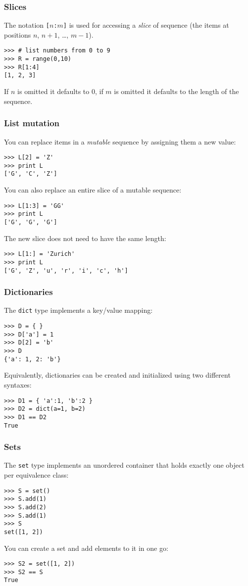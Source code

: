 \documentclass[english,serif,mathserif,xcolor=pdftex,dvipsnames,table]{beamer}
\begin{document}
\begin{frame}[fragile]
  \frametitle{Slices}
  The notation \texttt{[$n$:$m$]} is used for accessing a \emph{slice}
  of sequence (the items at positions $n$, $n+1$, \ldots, $m-1$).
\begin{lstlisting}
>>> # list numbers from 0 to 9
>>> R = range(0,10)
>>> R[1:4]
[1, 2, 3]
\end{lstlisting}

  \+
  If $n$ is omitted it defaults to 0, if $m$ is omitted it defaults to
  the length of the sequence.
\end{frame}


\begin{frame}[fragile]
  \frametitle{List mutation}
  You can replace items in a \emph{mutable} sequence by assigning them
  a new value:
\begin{lstlisting}
>>> L[2] = 'Z'
>>> print L
['G', 'C', 'Z']
\end{lstlisting}

  You can also replace an entire slice of a mutable sequence:
\begin{lstlisting}
>>> L[1:3] = 'GG'
>>> print L
['G', 'G', 'G']
\end{lstlisting}
  The new slice does not need to have the same length:
\begin{lstlisting}
>>> L[1:] = 'Zurich'
>>> print L
['G', 'Z', 'u', 'r', 'i', 'c', 'h']
\end{lstlisting}
\end{frame}


\begin{frame}[fragile]
  \frametitle{Dictionaries}
  The \texttt{dict} type implements a key/value mapping:
\begin{lstlisting}
>>> D = { }
>>> D['a'] = 1
>>> D[2] = 'b'
>>> D
{'a': 1, 2: 'b'}
\end{lstlisting}

  \+ 
  Equivalently, dictionaries can be created and initialized using two
  different syntaxes:
\begin{lstlisting}
>>> D1 = { 'a':1, 'b':2 }
>>> D2 = dict(a=1, b=2)
>>> D1 == D2
True
\end{lstlisting}
\end{frame}


\begin{frame}[fragile]
  \frametitle{Sets}
  The \texttt{set} type implements an unordered container that holds
  exactly one object per equivalence class:
\begin{lstlisting}
>>> S = set()
>>> S.add(1)
>>> S.add(2)
>>> S.add(1)
>>> S
set([1, 2])
\end{lstlisting}

  \+
  You can create a set and add elements to it in one go:
\begin{lstlisting}
>>> S2 = set([1, 2])
>>> S2 == S
True
\end{lstlisting}
\end{frame}
\end{document}
